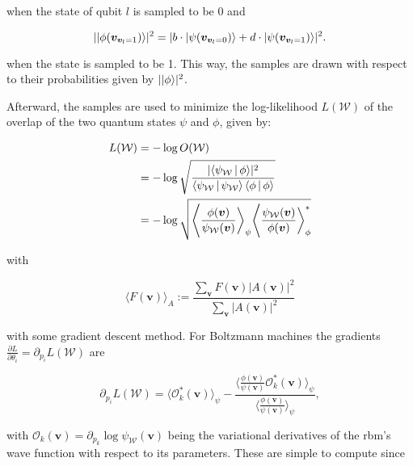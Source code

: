 when the state of qubit $l$ is sampled to be 0 and 

\begin{equation}
    \label{eq:prob2}
    \lvert \ket{\phi(\bm{v}_{\bm{v}_l = 1})} \rvert^2 = 
    \lvert  b \cdot \ket{\psi(\bm{v}_{\bm{v}_l = 0})} +
            d \cdot \ket{\psi(\bm{v}_{\bm{v}_l = 1})}
    \rvert^2.
\end{equation}

when the state is sampled to be 1. This way, the samples are drawn with respect to their 
probabilities given by $\lvert \Ket{\phi} \rvert^2$.

Afterward, the samples are used to minimize the log-likelihood $L(\mathcal{W})$ of the overlap of the two quantum 
states $\psi$ and $\phi$, given by:

\begin{align}
    L(\mathcal{W}) &= -\log{O(\mathcal{W})} \\
                   &= -\log{\sqrt{\frac{\lvert \Braket{\psi_{\mathcal{W}}|\phi} \rvert^2}{\Braket{\psi_{\mathcal{W}}|\psi_{\mathcal{W}}} \Braket{\phi|\phi}}}}\\
                   &= -\log{\sqrt{\Bigg\langle \frac{\phi(\bm{v})}{\psi_{\mathcal{W}}(\bm{v})} \bigg \rangle_{\psi} \Bigg\langle \frac{\psi_{\mathcal{W}}(\bm{v})}{\phi(\bm{v})} \bigg \rangle_{\phi}^{*}}}
\end{align}

with

\begin{equation}
    \langle F(\bm{v})\rangle_A := \frac{\sum_{\bm{v}} F(\bm{v}) \lvert A(\bm{v}) \rvert^2}{\sum_{\bm{v}} \lvert A(\bm{v})\rvert^2}
\end{equation}

with some gradient descent method. For Boltzmann machines the gradients $\frac{\partial L}{\partial \theta_i} = \partial_{p_i}L(\mathcal{W})$ are

\begin{equation}
   \label{eq:lossgrad}
   \partial_{p_i}L(\mathcal{W}) = \langle \mathcal{O}_k^*(\bm{v}) \rangle_{\psi} - \frac{\langle \frac{\phi(\bm{v})}{\psi(\bm{v})} \mathcal{O}_k^*(\bm{v})\rangle_{\psi}}{\langle \frac{\phi(\bm{v})}{\psi(\bm{v})} \rangle_{\psi}},
\end{equation}

with $\mathcal{O}_k(\bm{v}) = \partial_{p_k}\log{\psi_{\mathcal{W}}(\bm{v})}$ being the variational derivatives of the \gls{rbm}'s wave function with respect to its parameters.
These are simple to compute since

